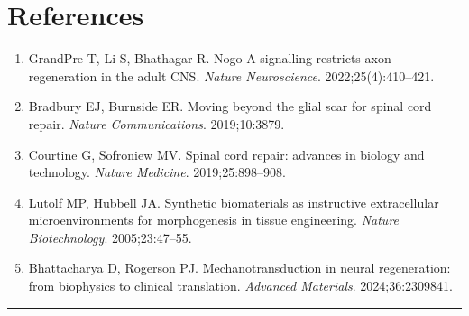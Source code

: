 \section{References}

\vspace{4pt}
\begin{enumerate}[label=\lbrack\arabic*\rbrack, leftmargin=2em, itemsep=2pt]
  \item GrandPre T, Li S, Bhathagar R. Nogo-A signalling restricts axon regeneration
    in the adult CNS. \textit{Nature Neuroscience}. 2022;25(4):410--421.
  \item Bradbury EJ, Burnside ER. Moving beyond the glial scar for spinal cord repair.
    \textit{Nature Communications}. 2019;10:3879.
  \item Courtine G, Sofroniew MV. Spinal cord repair: advances in biology and technology.
    \textit{Nature Medicine}. 2019;25:898--908.
  \item Lutolf MP, Hubbell JA. Synthetic biomaterials as instructive extracellular
    microenvironments for morphogenesis in tissue engineering.
    \textit{Nature Biotechnology}. 2005;23:47--55.
  \item Bhattacharya D, Rogerson PJ. Mechanotransduction in neural regeneration:
    from biophysics to clinical translation. \textit{Advanced Materials}.
    2024;36:2309841.
\end{enumerate}

\vspace{10pt}
\noindent\rule{\linewidth}{0.5pt}
\vspace{2pt}

